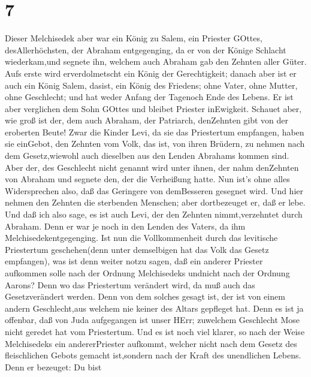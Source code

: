 \hypertarget{section-5}{%
\section{7}\label{section-5}}

 Dieser Melchisedek aber war ein König zu Salem, ein
Priester GOttes, desAllerhöchsten, der Abraham entgegenging, da er von
der Könige Schlacht wiederkam,und segnete ihn,  welchem auch
Abraham gab den Zehnten aller Güter. Aufs erste wird erverdolmetscht ein
König der Gerechtigkeit; danach aber ist er auch ein König Salem,
dasist, ein König des Friedens;  ohne Vater, ohne Mutter,
ohne Geschlecht; und hat weder Anfang der Tagenoch Ende des Lebens. Er
ist aber verglichen dem Sohn GOttes und bleibet Priester inEwigkeit.
 Schauet aber, wie groß ist der, dem auch Abraham, der
Patriarch, denZehnten gibt von der eroberten Beute!  Zwar
die Kinder Levi, da sie das Priestertum empfangen, haben sie einGebot,
den Zehnten vom Volk, das ist, von ihren Brüdern, zu nehmen nach dem
Gesetz,wiewohl auch dieselben aus den Lenden Abrahams kommen sind.
 Aber der, des Geschlecht nicht genannt wird unter ihnen,
der nahm denZehnten von Abraham und segnete den, der die Verheißung
hatte.  Nun ist's ohne alles Widersprechen also, daß das
Geringere von demBesseren gesegnet wird.  Und hier nehmen
den Zehnten die sterbenden Menschen; aber dortbezeuget er, daß er lebe.
 Und daß ich also sage, es ist auch Levi, der den Zehnten
nimmt,verzehntet durch Abraham.  Denn er war je noch in den
Lenden des Vaters, da ihm Melchisedekentgegenging.  Ist nun
die Vollkommenheit durch das levitische Priestertum geschehen(denn unter
demselbigen hat das Volk das Gesetz empfangen), was ist denn weiter
notzu sagen, daß ein anderer Priester aufkommen solle nach der Ordnung
Melchisedeks undnicht nach der Ordnung Aarons?  Denn wo das
Priestertum verändert wird, da muß auch das Gesetzverändert werden.
 Denn von dem solches gesagt ist, der ist von einem andern
Geschlecht,aus welchem nie keiner des Altars gepfleget hat.
 Denn es ist ja offenbar, daß von Juda aufgegangen ist
unser HErr; zuwelchem Geschlecht Mose nicht geredet hat vom Priestertum.
 Und es ist noch viel klarer, so nach der Weise
Melchisedeks ein andererPriester aufkommt,  welcher nicht
nach dem Gesetz des fleischlichen Gebots gemacht ist,sondern nach der
Kraft des unendlichen Lebens.  Denn er bezeuget: Du bist

